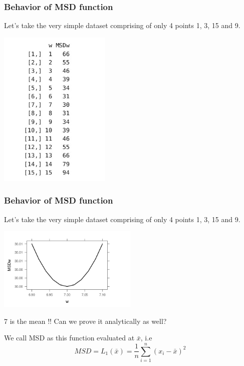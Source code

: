 \documentclass{beamer}\usepackage[]{graphicx}\usepackage[]{color}
\begin{document}
\begin{frame}

\frametitle{Behavior of MSD function}
Let's take the very simple dataset comprising of only 4 points 1, 3, 15 and 9.
\begin{center}
\includegraphics[width = 0.4\textwidth, keepaspectratio]{msdtable.jpeg} 
\end{center}
\end{frame}

\begin{frame}

\frametitle{Behavior of MSD function}
Let's take the very simple dataset comprising of only 4 points 1, 3, 15 and 9.
\begin{center}
\includegraphics[width = 0.5\textwidth, keepaspectratio]{msdw.jpeg} 
\end{center}

\pause
\begin{center}
\item 7 is the mean !! \pause Can we prove it analytically as well?

\item We call MSD as this function evaluated at $\bar{x}$, i.e $$MSD= L_1(\bar{x})= \frac{1}{n}\sum_{i=1}^{n}(x_i-\bar{x})^2$$
\end{center}
\end{frame}
\end{document}
